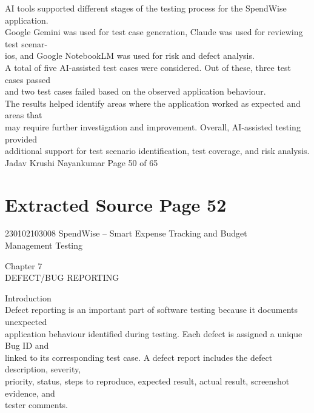 \documentclass[12pt,a4paper]{report}
\begin{document}
\smallskip
AI tools supported different stages of the testing process for the SpendWise application.\\ 
Google Gemini was used for test case generation, Claude was used for reviewing test scenar-\\ 
ios, and Google NotebookLM was used for risk and defect analysis.\\ 
A total of five AI-assisted test cases were considered. Out of these, three test cases passed\\ 
and two test cases failed based on the observed application behaviour.\\ 
The results helped identify areas where the application worked as expected and areas that\\ 
may require further investigation and improvement. Overall, AI-assisted testing provided\\ 
additional support for test scenario identification, test coverage, and risk analysis.\\ 

\smallskip
Jadav Krushi Nayankumar                                                       Page 50 of 65\\ 

\clearpage
\section*{Extracted Source Page 52}
230102103008                            SpendWise – Smart Expense Tracking and Budget\\ 
Management Testing\\ 

\smallskip

\smallskip

\smallskip
Chapter 7\\ 

\smallskip
DEFECT/BUG REPORTING\\ 

\smallskip

 Introduction\\ 

\smallskip
Defect reporting is an important part of software testing because it documents unexpected\\ 
application behaviour identified during testing. Each defect is assigned a unique Bug ID and\\ 
linked to its corresponding test case. A defect report includes the defect description, severity,\\ 
priority, status, steps to reproduce, expected result, actual result, screenshot evidence, and\\ 
tester comments.\\ 
\end{document}
